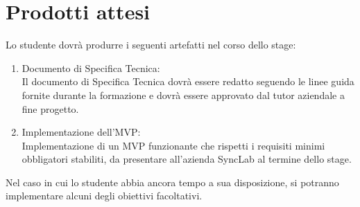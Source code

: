 \section*{Prodotti attesi}
Lo studente dovrà produrre i seguenti artefatti nel corso dello stage:
\begin{enumerate} 
    \item Documento di Specifica Tecnica: \\
    Il documento di Specifica Tecnica dovrà essere redatto
    seguendo le linee guida fornite durante la formazione e dovrà
    essere approvato dal tutor aziendale a fine progetto.
    
    
    \item Implementazione dell'MVP: \\
    Implementazione di un MVP funzionante che rispetti i requisiti minimi 
    obbligatori stabiliti, da presentare all'azienda SyncLab al termine dello stage.
\end{enumerate}

Nel caso in cui lo studente abbia ancora tempo a sua disposizione, si potranno implementare alcuni degli obiettivi  facoltativi.